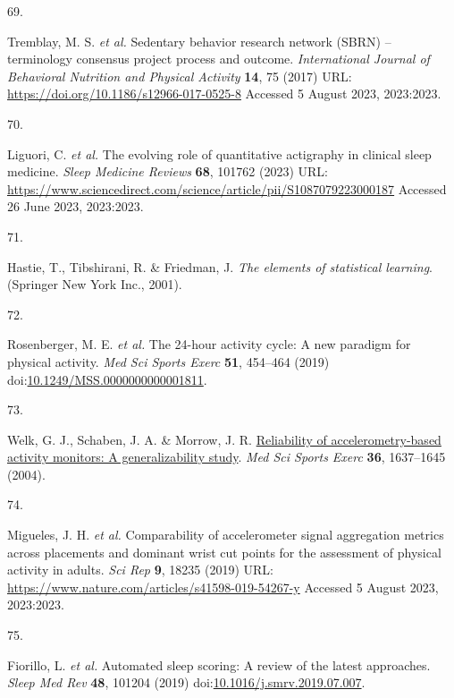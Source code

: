 \documentclass[
  9pt,
]{scrbook}
\newlength{\cslhangindent}
\newlength{\csllabelwidth}
\newlength{\cslentryspacingunit} %
\newenvironment{CSLReferences}[2] %
 {%
  \setlength{\parindent}{0pt}
  \ifodd #1
  \let\oldpar\par
  \def\par{\hangindent=\cslhangindent\oldpar}
  \fi
  \setlength{\parskip}{#2\cslentryspacingunit}
 }%
 {}
\newcommand{\CSLLeftMargin}[1]{\parbox[t]{\csllabelwidth}{#1}}
\newcommand{\CSLRightInline}[1]{\parbox[t]{\linewidth - \csllabelwidth}{#1}\break}
\begin{document}
\begin{CSLReferences}{0}{0}
\leavevmode{}%
\CSLLeftMargin{69. }%
\CSLRightInline{Tremblay, M. S. \emph{et al.} Sedentary behavior
research network ({SBRN}) -- terminology consensus project process and
outcome. \emph{International Journal of Behavioral Nutrition and
Physical Activity} \textbf{14}, 75 (2017) URL:
\url{https://doi.org/10.1186/s12966-017-0525-8} Accessed 5 August 2023,
2023:2023.}

\leavevmode{}%
\CSLLeftMargin{70. }%
\CSLRightInline{Liguori, C. \emph{et al.} The evolving role of
quantitative actigraphy in clinical sleep medicine. \emph{Sleep Medicine
Reviews} \textbf{68}, 101762 (2023) URL:
\url{https://www.sciencedirect.com/science/article/pii/S1087079223000187}
Accessed 26 June 2023, 2023:2023.}

\leavevmode{}%
\CSLLeftMargin{71. }%
\CSLRightInline{Hastie, T., Tibshirani, R. \& Friedman, J. \emph{The
elements of statistical learning}. (Springer New York Inc., 2001).}

\leavevmode{}%
\CSLLeftMargin{72. }%
\CSLRightInline{Rosenberger, M. E. \emph{et al.} The 24-hour activity
cycle: A new paradigm for physical activity. \emph{Med Sci Sports Exerc}
\textbf{51}, 454--464 (2019)
doi:\href{https://doi.org/10.1249/MSS.0000000000001811}{10.1249/MSS.0000000000001811}.}

\leavevmode{}%
\CSLLeftMargin{73. }%
\CSLRightInline{Welk, G. J., Schaben, J. A. \& Morrow, J. R.
\href{https://www.ncbi.nlm.nih.gov/pubmed/15354049}{Reliability of
accelerometry-based activity monitors: A generalizability study}.
\emph{Med Sci Sports Exerc} \textbf{36}, 1637--1645 (2004).}

\leavevmode{}%
\CSLLeftMargin{74. }%
\CSLRightInline{Migueles, J. H. \emph{et al.} Comparability of
accelerometer signal aggregation metrics across placements and dominant
wrist cut points for the assessment of physical activity in adults.
\emph{Sci Rep} \textbf{9}, 18235 (2019) URL:
\url{https://www.nature.com/articles/s41598-019-54267-y} Accessed 5
August 2023, 2023:2023.}

\leavevmode{}%
\CSLLeftMargin{75. }%
\CSLRightInline{Fiorillo, L. \emph{et al.} Automated sleep scoring: A
review of the latest approaches. \emph{Sleep Med Rev} \textbf{48},
101204 (2019)
doi:\href{https://doi.org/10.1016/j.smrv.2019.07.007}{10.1016/j.smrv.2019.07.007}.}


\end{CSLReferences}
\end{document}
